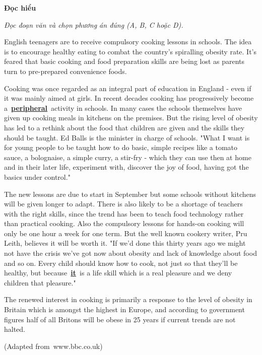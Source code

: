 \documentclass[12pt,a4paper,twoside]{article}
\newenvironment{readingpassage}[1][]{%
    \begin{tcolorbox}[enhanced, colback=grayLight, colframe=secondaryBlue,
        coltitle=textDark, fonttitle=\bfseries, title={#1},
        rounded corners, arc=3mm, boxrule=1pt,
        left=15pt, right=15pt, top=10pt, bottom=10pt,
        breakable, before skip=10pt, after skip=10pt, drop fuzzy shadow]
    \setstretch{1.3}
}{\end{tcolorbox}}
\begin{document}
\begin{groupbox}\textbf{\large Đọc hiểu}\end{groupbox}
\textit{Đọc đoạn văn và chọn phương án đúng (A, B, C hoặc D).}
\begin{readingpassage}[]
English teenagers are to receive compulsory cooking lessons in schools. The idea is to encourage healthy eating to combat the country's spiralling obesity rate. It's feared that basic cooking and food preparation skills are being lost as parents turn to pre-prepared convenience foods.

Cooking was once regarded as an integral part of education in England - even if it was mainly aimed at girls. In recent decades cooking has progressively become a \underline{\textbf{peripheral}} activity in schools. In many cases the schools themselves have given up cooking meals in kitchens on the premises. But the rising level of obesity has led to a rethink about the food that children are given and the skills they should be taught. Ed Balls is the minister in charge of schools. "What I want is for young people to be taught how to do basic, simple recipes like a tomato sauce, a bolognaise, a simple curry, a stir-fry - which they can use then at home and in their later life, experiment with, discover the joy of food, having got the basics under control."

The new lessons are due to start in September but some schools without kitchens will be given longer to adapt. There is also likely to be a shortage of teachers with the right skills, since the trend has been to teach food technology rather than practical cooking. Also the compulsory lessons for hands-on cooking will only be one hour a week for one term. But the well known cookery writer, Pru Leith, believes it will be worth it. "If we'd done this thirty years ago we might not have the crisis we've got now about obesity and lack of knowledge about food and so on. Every child should know how to cook, not just so that they'll be healthy, but because \underline{\textbf{it}} is a life skill which is a real pleasure and we deny children that pleasure."

The renewed interest in cooking is primarily a response to the level of obesity in Britain which is amongst the highest in Europe, and according to government figures half of all Britons will be obese in 25 years if current trends are not halted.

(Adapted from www.bbc.co.uk)
\end{readingpassage}
\end{document}
